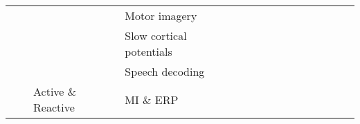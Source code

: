 \begin{tabular}{p{1.5cm}p{1.5cm}p{1.5cm}p{1.5cm}p{0.6cm}p{0.6cm}p{0.6cm}p{0.6cm}p{0.6cm}p{0.6cm}p{0.6cm}p{0.6cm}p{0.6cm}p{0.6cm}p{0.6cm}}
                                &                 &                   & Motor imagery &                                   \cite{Zhang2017a, Li2014} &  \cite{Gao2018, Sakhavi2017, Tang2017, Schirrmeister2017, Dharamsi2017, Loshchilov2017, Tabar2016a, Sakhavi2015, Yang2015a} &                                                      \cite{Zhang2018c} &                        \cite{An2014} &  \cite{Chiarelli2018, Major2017, Alomari2013, Mohamed2011} &                      &                         &            \cite{Normand2015} &   \cite{Zhang2017g} &                         &                                            \cite{Zhang2017d, Bu2010} \\
                                &                 &                   & Slow cortical potentials &                                                             &                                                                                                                             &                                                                        &                                      &                                                            &                      &                         &               \cite{Ding2015} &                     &                         &                                                                      \\
                                &                 &                   & Speech decoding &                                                             &                                                                                                                             &                                                                        &                      \cite{Sree2017} &                                                            &                      &                         &                               &                     &          \cite{Sun2016} &                                                                      \\
                                &                 & Active \& Reactive & MI \& ERP &                                                             &                                                                                                          \cite{Lawhern2018} &                                                                        &                                      &                                                            &                      &                         &                               &                     &                         &                                                                      \\

\end{tabular}
